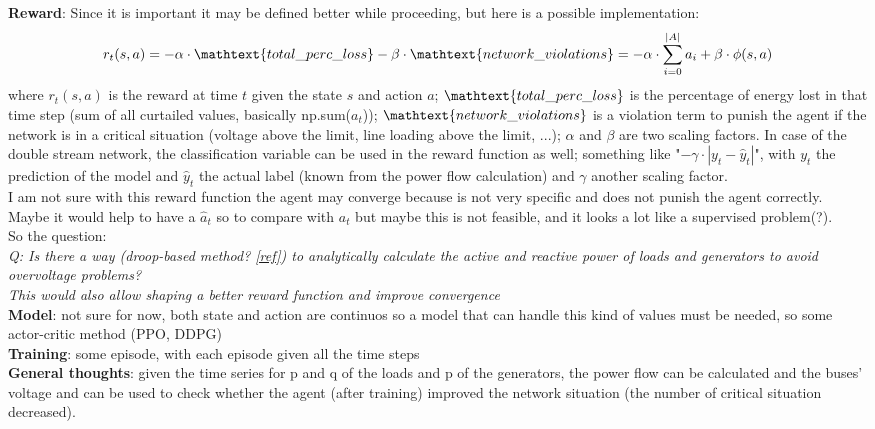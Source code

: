 \noindent \textbf{Reward}: 
Since it is important it may be defined better while proceeding, but here is a possible implementation:
\[
r_t(s,a) = - \alpha \cdot \mathtext{total\_perc\_loss} - \beta \cdot \mathtext{network\_violations} = -
\alpha \cdot \sum^{|A|}_{i=0} a_i + \beta \cdot \phi(s,a)
\]
\noindent where $r_t(s,a)$ is the reward at time $t$ given the state $s$ and action $a$; $\mathtext{total\_perc\_loss}$ is the percentage of energy lost in that time step (sum of all curtailed values, basically np.sum($a_t$)); $\mathtext{network\_violations}$ is a violation term to punish the agent if the network is in a critical situation (voltage above the limit, line loading above the limit, ...); $\alpha$ and $\beta$ are two scaling factors. In case of the double stream network, the classification variable can be used in the reward function as well; something like "$- \gamma \cdot |y_t - \hat{y}_t|$", with $y_t$ the prediction of the model and $\hat{y}_t$ the actual label (known from the power flow calculation) and $\gamma$ another scaling factor.\\

I am not sure with this reward function the agent may converge because is not very specific and does not punish the agent correctly. Maybe it would help to have a $\hat{a}_t$ so to compare with $a_t$ but maybe this is not feasible, and it looks a lot like a supervised problem(?).\\
So the question:\\
\emph{Q: Is there a way (droop-based method? \href{https://par.nsf.gov/servlets/purl/10082801}{[ref]}) to analytically calculate the active and reactive power of loads and generators to avoid overvoltage problems? \\
This would also allow shaping a better reward function and improve convergence}\\

\noindent \textbf{Model}: not sure for now, both state and action are continuos so a model that can handle this kind of values must be needed, so some actor-critic method (PPO, DDPG)\\

\noindent \textbf{Training}: some episode, with each episode given all the time steps\\

\noindent \textbf{General thoughts}: given the time series for p and q of the loads and p of the generators, the power flow can be calculated and the buses' voltage and can be used to check whether the agent (after training) improved the network situation (the number of critical situation decreased). \\

